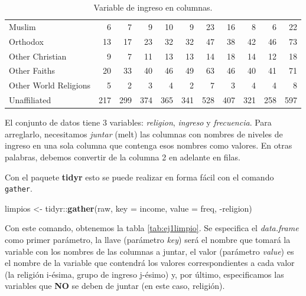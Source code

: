 \documentclass[]{article}
\newenvironment{Shaded}{\begin{snugshade}}{\end{snugshade}}
\newcommand{\KeywordTok}[1]{\textcolor[rgb]{0.13,0.29,0.53}{\textbf{{#1}}}}
\newcommand{\DataTypeTok}[1]{\textcolor[rgb]{0.13,0.29,0.53}{{#1}}}
\newcommand{\StringTok}[1]{\textcolor[rgb]{0.31,0.60,0.02}{{#1}}}
\newcommand{\NormalTok}[1]{{#1}}
\begin{document}
\begin{table}[ht]
\begin{tabular}{lrrrrrrrrrr}
  Muslim &   6 &   7 &   9 &  10 &   9 &  23 &  16 &   8 &   6 &  22 \\ 
  Orthodox &  13 &  17 &  23 &  32 &  32 &  47 &  38 &  42 &  46 &  73 \\ 
  Other Christian &   9 &   7 &  11 &  13 &  13 &  14 &  18 &  14 &  12 &  18 \\ 
  Other Faiths &  20 &  33 &  40 &  46 &  49 &  63 &  46 &  40 &  41 &  71 \\ 
  Other World Religions &   5 &   2 &   3 &   4 &   2 &   7 &   3 &   4 &   4 &   8 \\ 
  Unaffiliated & 217 & 299 & 374 & 365 & 341 & 528 & 407 & 321 & 258 & 597 \\ 
   \hline
\end{tabular}
\endgroup
\caption{Variable de ingreso en columnas.} 
\label{tab:varsencols}
\end{table}

El conjunto de datos tiene 3 variables: \emph{religion}, \emph{ingreso}
y \emph{frecuencia}. Para arreglarlo, necesitamos \emph{juntar} (melt)
las columnas con nombres de niveles de ingreso en una sola columna que
contenga esos nombres como valores. En otras palabras, debemos convertir
de la columna 2 en adelante en filas.

Con el paquete \textbf{tidyr} esto se puede realizar en forma fácil con
el comando \texttt{gather}.

\begin{Shaded}
\begin{Highlighting}[]
\NormalTok{limpios <-}\StringTok{ }\NormalTok{tidyr::}\KeywordTok{gather}\NormalTok{(raw, }\DataTypeTok{key =} \NormalTok{income, }\DataTypeTok{value =} \NormalTok{freq, -religion)}
\end{Highlighting}
\end{Shaded}

Con este comando, obtenemos la tabla \ref{tab:ej1limpio}. Se especifica
el \emph{data.frame} como primer parámetro, la llave (parámetro
\emph{key}) será el nombre que tomará la variable con los nombres de las
columnas a juntar, el valor (parámetro \emph{value}) es el nombre de la
variable que contendrá los valores correspondientes a cada valor (la
religión i-ésima, grupo de ingreso j-ésimo) y, por último, especificamos
las variables que \textbf{NO} se deben de juntar (en este caso,
religión).
\end{document}
